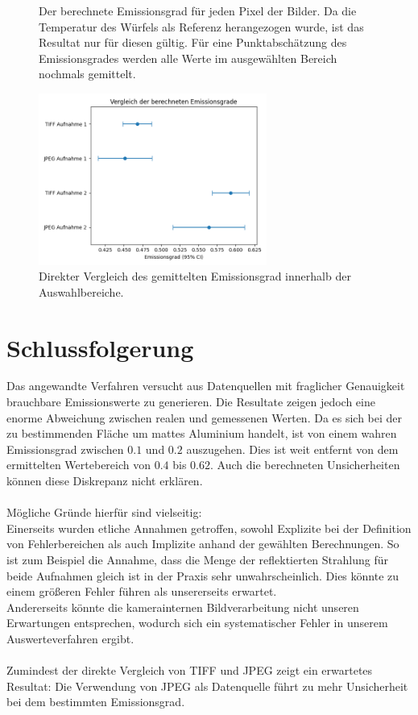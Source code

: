 \documentclass{article}
\begin{document}
\begin{figure}[H]
    \caption{
        Der berechnete Emissionsgrad für jeden Pixel der Bilder.
        Da die Temperatur des Würfels als Referenz herangezogen wurde, ist das Resultat nur für diesen gültig.
        Für eine Punktabschätzung des Emissionsgrades werden alle Werte im ausgewählten Bereich nochmals gemittelt.
    }
\end{figure}

\begin{figure}[H]
    \centering
    \captionsetup{width=7cm}
    \includegraphics[width=7.5cm]{img/eps_comp.png}
    \caption{
        Direkter Vergleich des gemittelten Emissionsgrad innerhalb der Auswahlbereiche.
    }
\end{figure}


\section{Schlussfolgerung}
Das angewandte Verfahren versucht aus Datenquellen mit fraglicher Genauigkeit brauchbare Emissionswerte zu generieren.
Die Resultate zeigen jedoch eine enorme Abweichung zwischen realen und gemessenen Werten.
Da es sich bei der zu bestimmenden Fläche um mattes Aluminium handelt, ist von einem wahren Emissionsgrad zwischen $0.1$ und $0.2$ auszugehen.
Dies ist weit entfernt von dem ermittelten Wertebereich von $0.4$ bis $0.62$.
Auch die berechneten Unsicherheiten können diese Diskrepanz nicht erklären.
\\
\\
Mögliche Gründe hierfür sind vielseitig:\\
Einerseits wurden etliche Annahmen getroffen, sowohl Explizite bei der Definition von Fehlerbereichen als auch Implizite anhand der gewählten Berechnungen.
So ist zum Beispiel die Annahme, dass die Menge der reflektierten Strahlung für beide Aufnahmen gleich ist in der Praxis sehr unwahrscheinlich.
Dies könnte zu einem größeren Fehler führen als unsererseits erwartet.\\
Andererseits könnte die kamerainternen Bildverarbeitung nicht unseren Erwartungen entsprechen, wodurch sich ein systematischer Fehler in unserem Auswerteverfahren ergibt.
\\
\\
Zumindest der direkte Vergleich von TIFF und JPEG zeigt ein erwartetes Resultat: Die Verwendung von JPEG als Datenquelle führt zu mehr Unsicherheit bei dem bestimmten Emissionsgrad.
\end{document}
